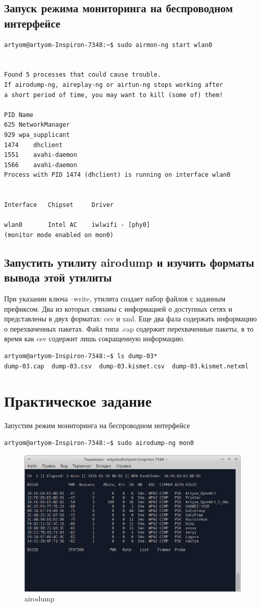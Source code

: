 \subsection{Запуск режима мониторинга на беспроводном интерфейсе}
\begin{lstlisting}
artyom@artyom-Inspiron-7348:~$ sudo airmon-ng start wlan0


Found 5 processes that could cause trouble.
If airodump-ng, aireplay-ng or airtun-ng stops working after
a short period of time, you may want to kill (some of) them!

PID	Name
625	NetworkManager
929	wpa_supplicant
1474	dhclient
1551	avahi-daemon
1566	avahi-daemon
Process with PID 1474 (dhclient) is running on interface wlan0


Interface	Chipset		Driver

wlan0		Intel AC	iwlwifi - [phy0]
(monitor mode enabled on mon0)
\end{lstlisting}
\subsection{Запустить утилиту airodump и изучить форматы вывода этой утилиты}
При указании ключа --write, утилита создает набор файлов с заданным префиксом. Два из которых связаны с информацией о доступных сетях и представлены в двух форматах: csv и xml. Еще два фала содержать информацию о перехваченных пакетах. Файл типа .cap содержит перехваченные пакеты, в то время как csv содержит лишь сокращенную информацию.

\begin{lstlisting}
artyom@artyom-Inspiron-7348:~$ ls dump-03*
dump-03.cap  dump-03.csv  dump-03.kismet.csv  dump-03.kismet.netxml
\end{lstlisting}
\section{Практическое задание}
Запустим режим мониторинга на беспроводном интерфейсе

\begin{lstlisting}
artyom@artyom-Inspiron-7348:~$ sudo airodump-ng mon0
\end{lstlisting}

\begin{figure}[H]
	\centering
	\includegraphics[width=\textwidth]{figures/1.png}
	\caption{airodump}
\end{figure}

